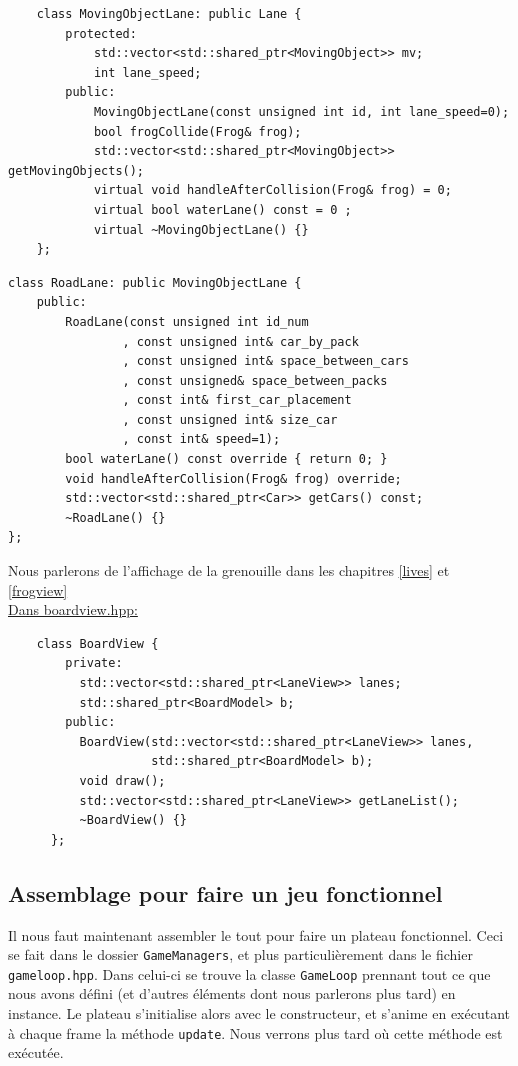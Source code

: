 \documentclass[a4paper, 12pt]{article}
\begin{document}
\begin{lstlisting}
    class MovingObjectLane: public Lane {
        protected:
            std::vector<std::shared_ptr<MovingObject>> mv;
            int lane_speed;
        public:
            MovingObjectLane(const unsigned int id, int lane_speed=0);
            bool frogCollide(Frog& frog);
            std::vector<std::shared_ptr<MovingObject>> getMovingObjects();
            virtual void handleAfterCollision(Frog& frog) = 0;
            virtual bool waterLane() const = 0 ;
            virtual ~MovingObjectLane() {}
    };   
\end{lstlisting}

\begin{lstlisting}
class RoadLane: public MovingObjectLane {
    public:
        RoadLane(const unsigned int id_num
                , const unsigned int& car_by_pack
                , const unsigned int& space_between_cars
                , const unsigned& space_between_packs
                , const int& first_car_placement
                , const unsigned int& size_car
                , const int& speed=1);
        bool waterLane() const override { return 0; }
        void handleAfterCollision(Frog& frog) override;
        std::vector<std::shared_ptr<Car>> getCars() const;
        ~RoadLane() {}
};
\end{lstlisting}

Nous parlerons de l'affichage de la grenouille dans les chapitres \ref{lives} et \ref{frogview} \\

\underline{Dans boardview.hpp:} \hspace{0.5cm}

\begin{lstlisting}
    class BoardView {
        private:
          std::vector<std::shared_ptr<LaneView>> lanes;
          std::shared_ptr<BoardModel> b;
        public:
          BoardView(std::vector<std::shared_ptr<LaneView>> lanes,
                    std::shared_ptr<BoardModel> b);
          void draw();
          std::vector<std::shared_ptr<LaneView>> getLaneList();
          ~BoardView() {}
      };
\end{lstlisting}


\subsection{Assemblage pour faire un jeu fonctionnel}

Il nous faut maintenant assembler le tout pour faire un plateau fonctionnel. Ceci se fait dans le dossier \texttt{GameManagers}, et plus particulièrement dans le fichier \texttt{gameloop.hpp}. Dans celui-ci se trouve la classe \texttt{GameLoop} prennant tout ce que nous avons défini (et d'autres éléments dont nous parlerons plus tard) en instance. Le plateau s'initialise alors avec le constructeur, et s'anime en exécutant à chaque frame la méthode \texttt{update}. Nous verrons plus tard où cette méthode est exécutée.
\end{document}
